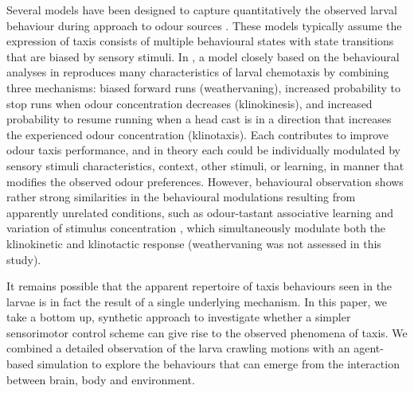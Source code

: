 \documentclass[11pt,a4paper]{article}
\newcommand{\todoBW}[1]{\todo[author=BW,color=orange, size=\tiny,inline]{1}}
\begin{document}
Several models have been designed to capture quantitatively the observed larval behaviour during approach to odour sources  \citep{davies2015model,hernandez2015reverse,schleyer2015learning,gepner2015computations}. These models typically assume the expression of taxis consists of multiple behavioural states with state transitions that are biased by sensory stimuli. In \cite{davies2015model}, a model closely based on the behavioural analyses in
 \citet{lahiri2011two,gomez2014multilevel,gomez2011active} reproduces many characteristics of larval chemotaxis by combining three mechanisms: biased forward runs (weathervaning), increased probability to stop runs when odour concentration decreases (klinokinesis), and increased probability to resume running when a head cast is in a direction that increases the experienced odour concentration (klinotaxis). Each contributes to improve odour taxis performance, and in theory each could be individually modulated by sensory stimuli characteristics, context, other stimuli, or learning, in manner that modifies the observed odour preferences. 
However, behavioural observation shows rather strong similarities in the behavioural modulations resulting from apparently unrelated conditions, such as odour-tastant associative learning and variation of stimulus concentration \citep{schleyer2015learning}, which simultaneously modulate both the klinokinetic and klinotactic response (weathervaning was not assessed in this study).

It remains possible that the apparent repertoire of taxis behaviours seen in the larvae is in fact the result of a single underlying mechanism. In this paper, we take a bottom up, synthetic approach \citep{braitenberg1986vehicles} to investigate whether a simpler sensorimotor control scheme can give rise to the observed phenomena of taxis. We combined a detailed observation of the larva crawling motions with an agent-based simulation to explore the behaviours that can emerge from the interaction between brain, body and environment.
\end{document}
